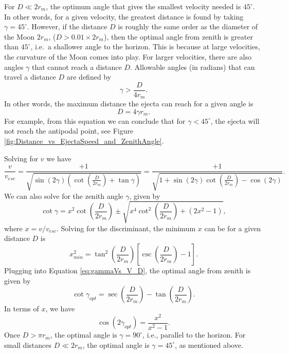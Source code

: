\documentclass{hitec}
\numberwithin{equation}{section}
\begin{document}
For $D \ll 2r_m$, the optimum angle that gives the smallest velocity needed is $45^\circ$. In other words, for a given velocity, the greatest distance is found by taking $\gamma = 45^\circ$. However, if the distance $D$ is roughly the same order as the diameter of the Moon $2r_m$, ($D > 0.01\times 2r_m$), then the optimal angle from zenith is greater than $45^\circ$, i.e.\ a shallower angle to the horizon. This is because at large velocities, the curvature of the Moon comes into play. For larger velocities, there are also angles $\gamma$ that cannot reach a distance $D$. Allowable angles (in radians) that can travel a distance $D$ are defined by
\begin{equation}
\gamma > \frac{D}{4r_m}.
\end{equation}
In other words, the maximum distance the ejecta can reach for a given angle is
\begin{equation}\label{eq:max_D_gamma}
D = 4\gamma r_m.
\end{equation}
For example, from this equation we can conclude that for $\gamma < 45^\circ$, the ejecta will not reach the antipodal point, see Figure \ref{fig:Distance_vs_EjectaSpeed_and_ZenithAngle}.


Solving for $v$ we have
\begin{equation}\label{eq:speed_asof_distance_angle}
\frac{v}{v_{esc}} = \frac{+1}{\sqrt{\sin(2\gamma)\left(\cot\left(\frac{D}{2r_m}\right)+\tan\gamma\right)}}
= \frac{+1}{\sqrt{1+\sin(2\gamma)\cot\left(\frac{D}{2r_m}\right)-\cos(2\gamma)}}.
\end{equation}
We can also solve for the zenith angle $\gamma$, given by
\begin{equation}\label{eq:gammaVs_V_D}
\cot\gamma = x^2\cot\left(\frac{D}{2r_m}\right) \pm \sqrt{x^4\cot^2\left(\frac{D}{2r_m}\right) + (2x^2-1)},
\end{equation}
where $x = v/v_{esc}$. Solving for the discriminant, the minimum $x$ can be for a given distance $D$ is
\begin{equation}
x_{min}^2 = \tan^2\left(\frac{D}{2r_m}\right)\left[\csc\left(\frac{D}{2r_m}\right)-1\right].
\end{equation}
Plugging into Equation \ref{eq:gammaVs_V_D}, the optimal angle from zenith is given by
\begin{equation}\label{eq:opt_angle}
\cot\gamma_{opt} = \sec\left(\frac{D}{2r_m}\right) - \tan\left(\frac{D}{2r_m}\right).
\end{equation}
In terms of $x$, we have
\begin{equation}
\cos(2\gamma_{opt}) = \frac{x^2}{x^2-1}.
\end{equation}
Once $D > \pi r_m$, the optimal angle is $\gamma = 90^\circ$, i.e., parallel to the horizon. For small distances $D \ll 2r_m$, the optimal angle is $\gamma = 45^\circ$, as mentioned above.
\end{document}

